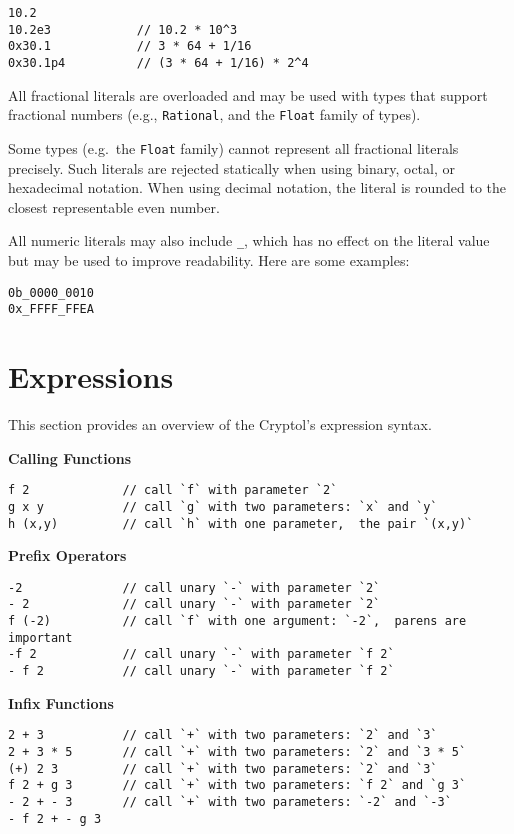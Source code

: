 \begin{verbatim}
10.2
10.2e3            // 10.2 * 10^3
0x30.1            // 3 * 64 + 1/16
0x30.1p4          // (3 * 64 + 1/16) * 2^4
\end{verbatim}

All fractional literals are overloaded and may be used with types that
support fractional numbers (e.g., \texttt{Rational}, and the
\texttt{Float} family of types).

Some types (e.g.~the \texttt{Float} family) cannot represent all
fractional literals precisely. Such literals are rejected statically
when using binary, octal, or hexadecimal notation. When using decimal
notation, the literal is rounded to the closest representable even
number.

All numeric literals may also include \texttt{\_}, which has no effect
on the literal value but may be used to improve readability. Here are
some examples:

\begin{verbatim}
0b_0000_0010
0x_FFFF_FFEA
\end{verbatim}

\section{Expressions}\label{expressions}

This section provides an overview of the Cryptol's expression syntax.

\textbf{Calling Functions}

\begin{verbatim}
f 2             // call `f` with parameter `2`
g x y           // call `g` with two parameters: `x` and `y`
h (x,y)         // call `h` with one parameter,  the pair `(x,y)`
\end{verbatim}

\textbf{Prefix Operators}

\begin{verbatim}
-2              // call unary `-` with parameter `2`
- 2             // call unary `-` with parameter `2`
f (-2)          // call `f` with one argument: `-2`,  parens are important
-f 2            // call unary `-` with parameter `f 2`
- f 2           // call unary `-` with parameter `f 2`
\end{verbatim}

\textbf{Infix Functions}

\begin{verbatim}
2 + 3           // call `+` with two parameters: `2` and `3`
2 + 3 * 5       // call `+` with two parameters: `2` and `3 * 5`
(+) 2 3         // call `+` with two parameters: `2` and `3`
f 2 + g 3       // call `+` with two parameters: `f 2` and `g 3`
- 2 + - 3       // call `+` with two parameters: `-2` and `-3`
- f 2 + - g 3
\end{verbatim}

